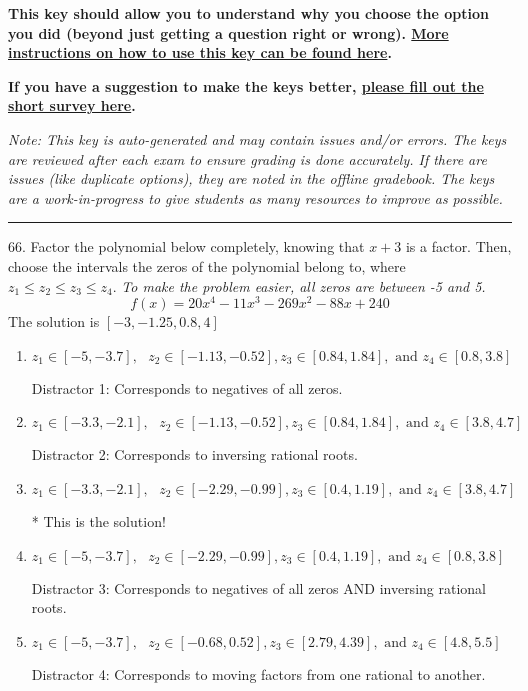 \documentclass{extbook}[14pt]
\begin{document}
\textbf{This key should allow you to understand why you choose the option you did (beyond just getting a question right or wrong). \href{https://xronos.clas.ufl.edu/mac1105spring2020/courseDescriptionAndMisc/Exams/LearningFromResults}{More instructions on how to use this key can be found here}.}

\textbf{If you have a suggestion to make the keys better, \href{https://forms.gle/CZkbZmPbC9XALEE88}{please fill out the short survey here}.}

\textit{Note: This key is auto-generated and may contain issues and/or errors. The keys are reviewed after each exam to ensure grading is done accurately. If there are issues (like duplicate options), they are noted in the offline gradebook. The keys are a work-in-progress to give students as many resources to improve as possible.}

\rule{\textwidth}{0.4pt}

66. Factor the polynomial below completely, knowing that $x+3$ is a factor. Then, choose the intervals the zeros of the polynomial belong to, where $z_1 \leq z_2 \leq z_3 \leq z_4$. \textit{To make the problem easier, all zeros are between -5 and 5.}
\[ f(x) = 20x^{4} -11 x^{3} -269 x^{2} -88 x + 240 \] 
The solution is $ [-3, -1.25, 0.8, 4] $ 

\begin{enumerate}[label=\Alph*.] 
\item $ z_1 \in [-5, -3.7], \text{   }  z_2 \in [-1.13, -0.52], z_3 \in [0.84, 1.84], \text{   and   } z_4 \in [0.8, 3.8] $ 

  Distractor 1: Corresponds to negatives of all zeros. 
\item $ z_1 \in [-3.3, -2.1], \text{   }  z_2 \in [-1.13, -0.52], z_3 \in [0.84, 1.84], \text{   and   } z_4 \in [3.8, 4.7] $ 

  Distractor 2: Corresponds to inversing rational roots. 
\item $ z_1 \in [-3.3, -2.1], \text{   }  z_2 \in [-2.29, -0.99], z_3 \in [0.4, 1.19], \text{   and   } z_4 \in [3.8, 4.7] $ 

 * This is the solution! 
\item $ z_1 \in [-5, -3.7], \text{   }  z_2 \in [-2.29, -0.99], z_3 \in [0.4, 1.19], \text{   and   } z_4 \in [0.8, 3.8] $ 

  Distractor 3: Corresponds to negatives of all zeros AND inversing rational roots. 
\item $ z_1 \in [-5, -3.7], \text{   }  z_2 \in [-0.68, 0.52], z_3 \in [2.79, 4.39], \text{   and   } z_4 \in [4.8, 5.5] $ 

  Distractor 4: Corresponds to moving factors from one rational to another. 
\end{enumerate} 
 
\end{document}
